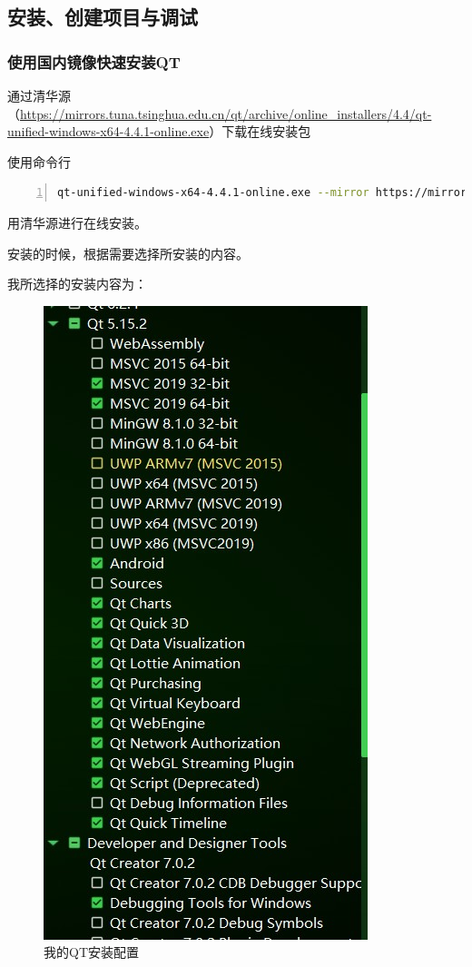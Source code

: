 \documentclass[cs4size,a4paper]{ctexart}
\numberwithin{equation}{section}
\numberwithin{table}{section}
\numberwithin{figure}{section}
\begin{document}
\subsection{安装、创建项目与调试}

\subsubsection{使用国内镜像快速安装QT}

通过清华源（\url{https://mirrors.tuna.tsinghua.edu.cn/qt/archive/online_installers/4.4/qt-unified-windows-x64-4.4.1-online.exe}）下载在线安装包

使用命令行

\begin{lstlisting}[language={bash},
    numbers=left,
    numberstyle=\tiny\monaco,
    basicstyle=\footnotesize\monaco]
qt-unified-windows-x64-4.4.1-online.exe --mirror https://mirrors.tuna.tsinghua.edu.cn/qt
\end{lstlisting}

用清华源进行在线安装。

安装的时候，根据需要选择所安装的内容。

我所选择的安装内容为：

\begin{figure}[H]
\small
\centering
\includegraphics{我的QT安装配置.jpg}
\caption{我的QT安装配置} \label{fig:我的QT安装配置}
\end{figure}
\end{document}
